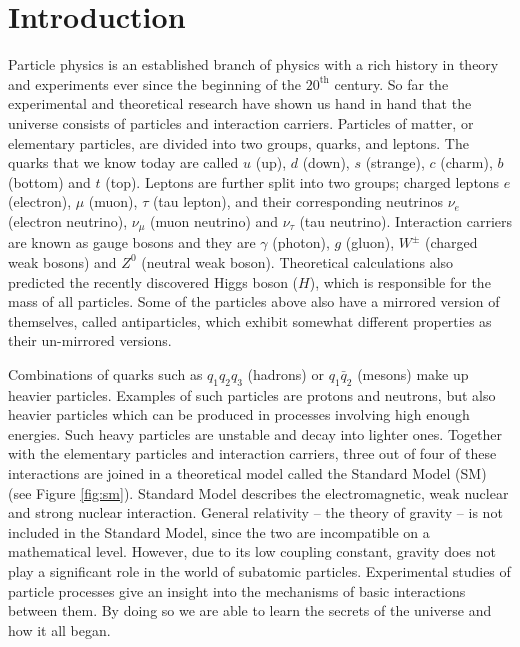 \pagestyle{plain}
\chapter{Introduction}
Particle physics is an established branch of physics with a rich history in theory and experiments ever since the beginning of the $20^{\mathrm{th}}$ century. So far the experimental and theoretical research have shown us hand in hand that the universe consists of particles and interaction carriers. Particles of matter, or elementary particles, are divided into two groups, quarks, and leptons. The quarks that we know today are called $u$ (up), $d$ (down), $s$ (strange), $c$ (charm), $b$ (bottom) and $t$ (top). Leptons are  further split into two groups; charged leptons $e$ (electron), $\mu$ (muon), $\tau$ (tau lepton), and their corresponding neutrinos $\nu_e$ (electron neutrino), $\nu_\mu$ (muon neutrino) and $\nu_\tau$ (tau neutrino). Interaction carriers are known as gauge bosons and they are $\gamma$ (photon), $g$ (gluon), $W^\pm$ (charged weak bosons) and $Z^0$ (neutral weak boson). Theoretical calculations also predicted the recently discovered Higgs boson ($H$), which is responsible for the mass of all particles. Some of the particles above also have a mirrored version of themselves, called antiparticles, which exhibit somewhat different properties as their un-mirrored versions.

Combinations of quarks such as $q_1 q_2 q_3$ (hadrons) or $q_1 \bar{q}_2$ (mesons) make up heavier particles. Examples of such particles are protons and neutrons, but also heavier particles which can be produced in processes involving high enough energies. Such heavy particles are unstable and decay into lighter ones. Together with the elementary particles and interaction carriers, three out of four of these interactions are joined in a theoretical model called the Standard Model (SM) \cite{GLASHOW1961579, PhysRevLett.19.1264, salam1994weak, GIMmech} (see Figure \ref{fig:sm}). Standard Model describes the electromagnetic, weak nuclear and strong nuclear interaction. General relativity -- the theory of gravity -- is not included in the Standard Model, since the two are incompatible on a mathematical level. However, due to its low coupling constant, gravity does not play a significant role in the world of subatomic particles. Experimental studies of particle processes give an insight into the mechanisms of basic interactions between them. By doing so we are able to learn the secrets of the universe and how it all began.


